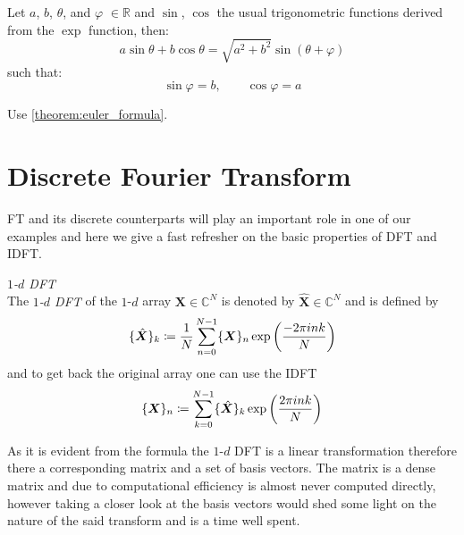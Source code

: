 	\begin{Cor}
		Let $a$, $b$, $\theta$, and $\varphi$ $\in \mathbb{R}$ and $\sin$, $\cos$ the usual trigonometric functions derived from the $\exp$ function, then:
		\begin{equation*}
			a\sin \theta+b\cos \theta  = \sqrt{a^2+b^2}\sin(\theta + \varphi)
		\end{equation*}
		such that:
		\begin{equation*}
			\sin\varphi=b, \qquad \cos\varphi = a
		\end{equation*}
		\end{Cor}
	\begin{Proof}
		Use \cref{theorem:euler_formula}.
	\end{Proof}


\section{Discrete Fourier Transform}
\ac{FT} and its discrete counterparts will play an important role in one of our examples and here we give a fast refresher on the basic properties of \ac{DFT} and \ac{IDFT}.

\begin{Def}\label{def:1ddft}
    \emph{$1$-$d$ \ac{DFT}}\\
    The \emph{$1$-$d$ \ac{DFT}} of the $1$-$d$ array $\boldsymbol{X} \in \mathbb{C}^{N}$ is denoted by 
    $\hat {\boldsymbol{X}} \in \mathbb{C}^{N}$ and is defined by
    \begin{equation}\label{eq:1ddft}
        \{\hat {\boldsymbol{X}}\}_{k} \coloneqq \frac{1}{N}\sum_{n=0}^{N-1} \{{\boldsymbol{X}}\}_{n}\exp\left({\frac{-2\pi ink}{N}}\right)\index{\ac{FT}!$1$-$d$ \ac{DFT}}
    \end{equation}
    and to get back the original array one can use the \ac{IDFT} 
    \begin{equation}\label{eq:1didft}
        \{{\boldsymbol{X}}\}_{n} \coloneqq \sum_{k=0}^{N-1}\{\hat {\boldsymbol{X}}\}_{k}\exp\left({\frac{2\pi ink}{N}}\right)\index{\ac{FT}!$1$-$d$ \ac{IDFT}}
    \end{equation}    
\end{Def}

As it is evident from the formula the $1$-$d$ \ac{DFT} is a linear transformation therefore there a corresponding matrix 
and a set of basis vectors. The matrix is a dense matrix\cite{Frazier1999}\cite{Cormen2022} and due to computational 
efficiency\cite{Frazier1999}\cite{Cormen2022} is almost never computed directly, however taking a closer look at the 
basis vectors would shed some light on the nature of the said transform and is a time well spent.

